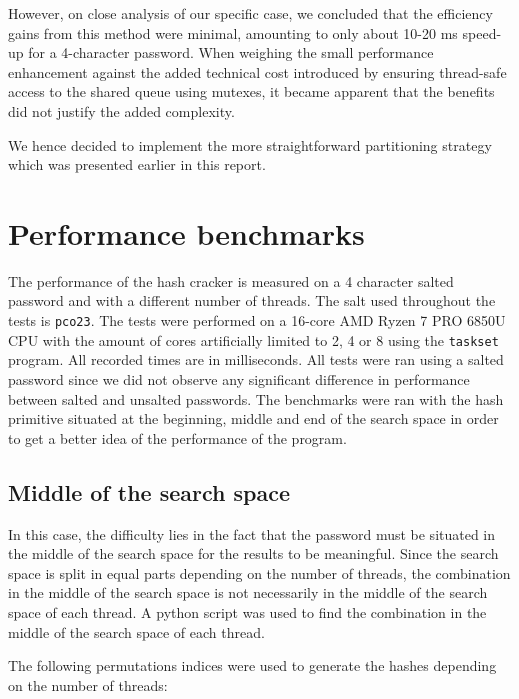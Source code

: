 \documentclass{article}
\begin{document}
However, on close analysis of our specific case, we concluded that the efficiency gains from this method were minimal,
amounting to only about 10-20 ms speed-up for a 4-character password. When weighing the small performance enhancement
 against the added technical cost introduced by ensuring thread-safe access to the shared queue using mutexes, it became
 apparent that the benefits did not justify the added complexity.

We hence decided to implement the more straightforward partitioning strategy which was presented earlier in this report.

\section{Performance benchmarks}

The performance of the hash cracker is measured on a 4 character salted password and with a different number of threads.
The salt used throughout the tests is \texttt{pco23}.
The tests were performed on a 16-core AMD Ryzen 7 PRO 6850U CPU with the amount of cores artificially limited to 2, 4 or
8 using the \texttt{taskset} program. All recorded times are in milliseconds. All tests were ran using a salted password since
we did not observe any significant difference in performance between salted and unsalted passwords.
The benchmarks were ran with the hash primitive situated at the beginning, middle and end of the search space in order
to get a better idea of the performance of the program.

\subsection*{Middle of the search space}

In this case, the difficulty lies in the fact that the password must be situated in the middle of the search space for
the results to be meaningful.
Since the search space is split in equal parts depending on the number of threads, the combination in the middle of the
search space is not necessarily in the middle of the search space of each thread. A python script was used to find the
combination in the middle of the search space of each thread.

The following permutations indices were used to generate the hashes depending on the number of threads:
\end{document}
